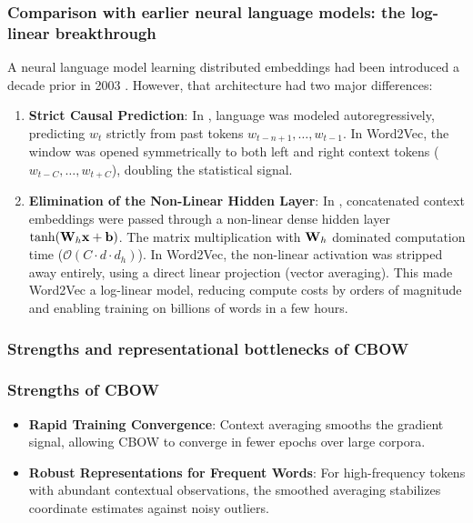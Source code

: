 \documentclass[../../../main.tex]{subfiles}
\begin{document}
\subsubsection{Comparison with earlier neural language models: the log-linear breakthrough}
\label{subsec:bengio_vs_mikolov}

A neural language model learning distributed embeddings had been introduced a decade prior in 2003 \cite{bengio2003}. However, that architecture had two major differences:
\begin{enumerate}
    \item \textbf{Strict Causal Prediction}: In \cite{bengio2003}, language was modeled autoregressively, predicting $w_t$ strictly from past tokens $w_{t-n+1}, \dots, w_{t-1}$. In Word2Vec, the window was opened symmetrically to both left and right context tokens ($w_{t-C}, \dots, w_{t+C}$), doubling the statistical signal.
    \item \textbf{Elimination of the Non-Linear Hidden Layer}: In \cite{bengio2003}, concatenated context embeddings were passed through a non-linear dense hidden layer $\tanh(\mathbf{W}_h \mathbf{x} + \mathbf{b})$. The matrix multiplication with $\mathbf{W}_h$ dominated computation time ($\mathcal{O}(C \cdot d \cdot d_h)$). In Word2Vec, the non-linear activation was stripped away entirely, using a direct linear projection (vector averaging). This made Word2Vec a log-linear model, reducing compute costs by orders of magnitude and enabling training on billions of words in a few hours.
\end{enumerate}

\subsubsection{Strengths and representational bottlenecks of CBOW}
\label{subsec:cbow_bottlenecks}

\subsubsection{Strengths of CBOW}
\begin{itemize}
    \item \textbf{Rapid Training Convergence}: Context averaging smooths the gradient signal, allowing CBOW to converge in fewer epochs over large corpora.
    \item \textbf{Robust Representations for Frequent Words}: For high-frequency tokens with abundant contextual observations, the smoothed averaging stabilizes coordinate estimates against noisy outliers.
\end{itemize}
\end{document}
